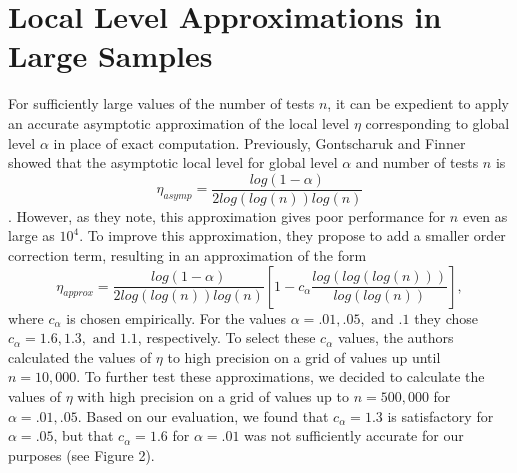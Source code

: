 \documentclass[article]{jss}
\begin{document}
\section{Local Level Approximations in Large Samples}
For sufficiently large values of the number of tests $n$, it can be expedient to apply an accurate asymptotic approximation of the local level $\eta$ corresponding to global level $\alpha$ in place of exact computation. Previously, Gontscharuk and Finner showed that the asymptotic local level for global level $\alpha$ and number of tests $n$ is
%
\begin{equation*}
    \eta_{asymp} = \frac{log(1 - \alpha)}{2log(log(n))log(n)}
\end{equation*}
%
\citep{gontscharuk2017asymptotics}. However, as they note, this approximation gives poor performance for $n$ even as large as $10^{4}$. To improve this approximation, they propose to add a smaller order correction term, resulting in an approximation of the form
%
\begin{equation}
    \eta_{approx} = \frac{log(1 - \alpha)}{2log(log(n))log(n)}\left[1 - c_{\alpha}\frac{log(log(log(n)))}{log(log(n))}\right],
\end{equation}
%
where $c_{\alpha}$ is chosen empirically. For the values $\alpha = .01, .05, \textrm{ and } .1$ they chose $c_{\alpha} = 1.6, 1.3, \textrm{ and } 1.1$, respectively. To select these $c_{\alpha}$ values, the authors calculated the values of $\eta$ to high precision on a grid of values up until $n = 10,000$. To further test these approximations, we decided to calculate the values of $\eta$ with high precision on a grid of values up to $n = 500,000$ for $\alpha = .01, .05$. Based on our evaluation, we found that $c_{\alpha} = 1.3$ is satisfactory for $\alpha = .05$, but that $c_{\alpha} = 1.6$ for $\alpha = .01$ was not sufficiently accurate for our purposes (see Figure 2).
\end{document}
